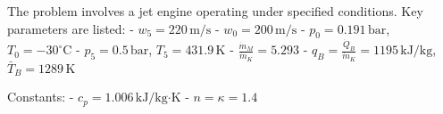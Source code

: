 The problem involves a jet engine operating under specified conditions. Key parameters are listed:  
- \( w_5 = 220 \, \text{m/s} \)  
- \( w_0 = 200 \, \text{m/s} \)  
- \( p_0 = 0.191 \, \text{bar} \), \( T_0 = -30^\circ\text{C} \)  
- \( p_5 = 0.5 \, \text{bar} \), \( T_5 = 431.9 \, \text{K} \)  
- \( \frac{\dot{m}_M}{\dot{m}_K} = 5.293 \)  
- \( q_B = \frac{\dot{Q}_B}{\dot{m}_K} = 1195 \, \text{kJ/kg} \), \( \bar{T}_B = 1289 \, \text{K} \)  

Constants:  
- \( c_p = 1.006 \, \text{kJ/kg·K} \)  
- \( n = \kappa = 1.4 \)
